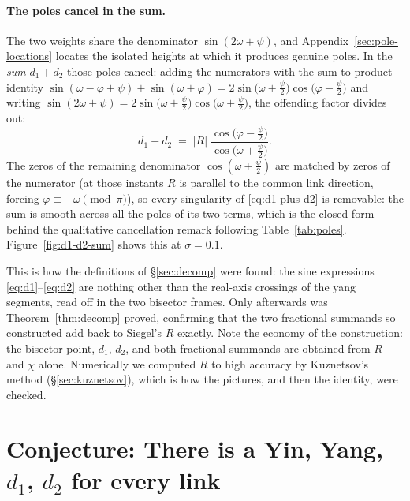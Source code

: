 \documentclass[11pt]{article}
\theoremstyle{definition}
\begin{document}
\paragraph{The poles cancel in the sum.} The two weights share the
denominator $\sin(2\omega+\psi)$, and Appendix~\ref{sec:pole-locations}
locates the isolated heights at which it produces genuine poles. In the
\emph{sum} $d_1+d_2$ those poles cancel: adding the numerators with the
sum-to-product identity
$\sin(\omega-\varphi+\psi)+\sin(\omega+\varphi)
=2\sin\bigl(\omega+\tfrac{\psi}{2}\bigr)\cos\bigl(\varphi-\tfrac{\psi}{2}\bigr)$
and writing
$\sin(2\omega+\psi)=2\sin\bigl(\omega+\tfrac{\psi}{2}\bigr)
\cos\bigl(\omega+\tfrac{\psi}{2}\bigr)$, the offending factor divides out:
\begin{equation}\label{eq:d1-plus-d2}
d_1+d_2
\;=\;
|R|\;
\frac{\cos\!\bigl(\varphi-\tfrac{\psi}{2}\bigr)}
     {\cos\!\bigl(\omega+\tfrac{\psi}{2}\bigr)} .
\end{equation}
The zeros of the remaining denominator $\cos(\omega+\tfrac{\psi}{2})$ are
matched by zeros of the numerator (at those instants $R$ is parallel to the
common link direction, forcing $\varphi\equiv-\omega\pmod\pi$), so every
singularity of \eqref{eq:d1-plus-d2} is removable: the sum is smooth across
all the poles of its two terms, which is the closed form behind the
qualitative cancellation remark following Table~\ref{tab:poles}.
Figure~\ref{fig:d1-d2-sum} shows this at $\sigma=0.1$.

This is how the definitions of \S\ref{sec:decomp} were found: the sine
expressions \eqref{eq:d1}--\eqref{eq:d2} are nothing other than the real-axis
crossings of the yang segments, read off in the two bisector frames. Only
afterwards was Theorem~\ref{thm:decomp} proved, confirming that the two
fractional summands so constructed add back to Siegel's $R$ exactly. Note the
economy of the construction: the bisector point, $d_1$, $d_2$, and both
fractional summands are obtained from $R$ and $\chi$ alone. Numerically we
computed $R$ to high accuracy by Kuznetsov's method (\S\ref{sec:kuznetsov}),
which is how the pictures, and then the identity, were checked.

\section{Conjecture: There is a Yin, Yang, \texorpdfstring{$d_1$, $d_2$}{d1, d2} for every link}\label{sec:general-yinyang}
\end{document}
